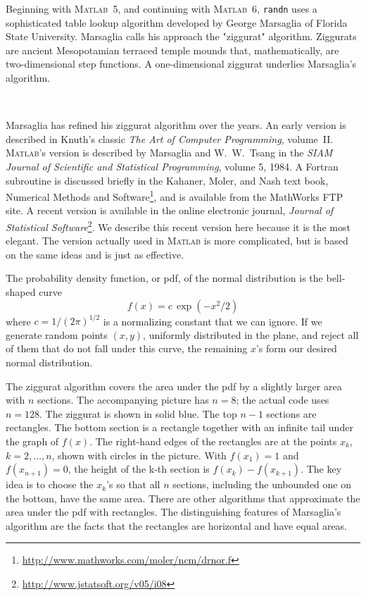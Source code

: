 \documentclass[a4paper,twocolumn,11pt]{article}
\newcommand{\Matlab}{{\textsc{Matlab}}}
\begin{document}
Beginning with {\Matlab}~5, and continuing with {\Matlab}~6, \verb!randn!
uses a sophisticated table lookup algorithm developed by George
Marsaglia of Florida State University. Marsaglia calls his approach
the "ziggurat" algorithm. Ziggurats are ancient Mesopotamian terraced
temple mounds that, mathematically, are two-dimensional step
functions. A one-dimensional ziggurat underlies Marsaglia's algorithm.
\begin{figure*}[t]			
\centering
{}
~
\end{figure*}			

Marsaglia has refined his ziggurat algorithm over the years. An early
version is described in Knuth's classic \emph{The Art of Computer
  Programming}, volume~II. {\Matlab}'s version is described by Marsaglia
and W.~W.~Tsang in the \emph{SIAM Journal of Scientific and
  Statistical Programming}, volume 5, 1984. A Fortran subroutine is
discussed briefly in the Kahaner, Moler, and Nash text book, Numerical
Methods and
Software\footnote{\url{http://www.mathworks.com/moler/ncm/drnor.f}},
and is available from the MathWorks FTP site. A recent version is
available in the online electronic journal, \emph{Journal of
  Statistical
  Software}\footnote{\url{http://www.jstatsoft.org/v05/i08}}. We
describe this recent version here because it is the most elegant. The
version actually used in {\Matlab} is more complicated, but is based on
the same ideas and is just as effective.

The probability density function, or pdf, of the normal distribution is the bell-shaped curve
$$
f(x) = c\,\exp(-x^2/2)
$$ where $c=1/(2\pi)^{1/2}$ is a normalizing constant that we can
ignore. If we generate random points $(x,y)$, uniformly distributed in
the plane, and reject all of them that do not fall under this curve,
the remaining $x$'s form our desired normal distribution.

The ziggurat algorithm covers the area under the pdf by a slightly
larger area with $n$ sections. The accompanying picture has $n = 8$;
the actual code uses $n = 128$. The ziggurat is shown in solid
blue. The top $n-1$ sections are rectangles. The bottom section is a
rectangle together with an infinite tail under the graph of
$f(x)$. The right-hand edges of the rectangles are at the points
$x_k$, $k=2,\ldots,n$, shown with circles in the picture. With
$f(x_1)=1$ and $f(x_{n+1})=0$, the height of the k-th section is
$f(x_k)-f(x_{k+1})$. The key idea is to choose the $x_k$'s so that all
$n$ sections, including the unbounded one on the bottom, have the same
area. There are other algorithms that approximate the area under the
pdf with rectangles. The distinguishing features of Marsaglia's
algorithm are the facts that the rectangles are horizontal and have
equal areas.
\end{document}
